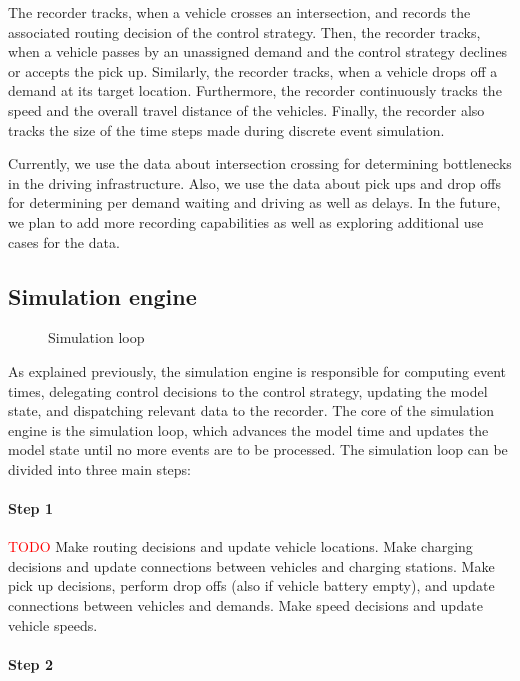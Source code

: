 \documentclass[a4paper,twoside]{article}
\begin{document}
	The recorder tracks, when a vehicle crosses an intersection, and records the associated routing decision of the control strategy.
	Then, the recorder tracks, when a vehicle passes by an unassigned demand and the control strategy declines or accepts the pick up.
	Similarly, the recorder tracks, when a vehicle drops off a demand at its target location.
	Furthermore, the recorder continuously tracks the speed and the overall travel distance of the vehicles.
	Finally, the recorder also tracks the size of the time steps made during discrete event simulation.
	
	Currently, we use the data about intersection crossing for determining bottlenecks in the driving infrastructure.
	Also, we use the data about pick ups and drop offs for determining per demand waiting and driving as well as delays.
	In the future, we plan to add more recording capabilities as well as exploring additional use cases for the data.
	
	\subsection{Simulation engine}
	\label{sec:simulation-engine}

	\begin{figure}[!ht]
		\caption{Simulation loop}
	\end{figure}
	
	As explained previously, the simulation engine is responsible for computing event times, delegating control decisions to the control strategy, updating the model state, and dispatching relevant data to the recorder.
	The core of the simulation engine is the simulation loop, which advances the model time and updates the model state until no more events are to be processed.
	The simulation loop can be divided into three main steps:
	
	\paragraph{Step 1}
	
	\textcolor{red}{TODO}
	Make routing decisions and update vehicle locations.
	Make charging decisions and update connections between vehicles and charging stations.
	Make pick up decisions, perform drop offs (also if vehicle battery empty), and update connections between vehicles and demands.
	Make speed decisions and update vehicle speeds.
	
	\paragraph{Step 2}
	
\end{document}
